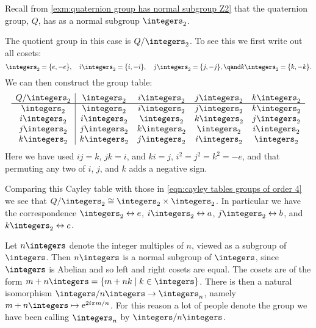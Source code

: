 \documentclass[fleqn]{NotesClass}
\newcommand*{\isomorphic}{\cong}
\newcommand*{\e}{\mathrm{e}}
\begin{document}
    \begin{exm}{}{}
        Recall from \cref{exm:quaternion group has normal subgroup Z2} that the quaternion group, \(Q\), has as a normal subgroup \(\integers_2\).
        
        The quotient group in this case is \(Q/\integers_2\).
        To see this we first write out all cosets:
        \begin{equation*}
            \integers_2 = \{e, -e\}, \quad i\integers_2 = \{i, -i\}, \quad j\integers_2 = \{j, -j\}, \qand k\integers_2 = \{k, -k\}.
        \end{equation*}
        We can then construct the group table:
        \begin{equation}
            \begin{array}{c|cccc}
                Q/\integers_2 & \integers_2  & i\integers_2 & j\integers_2 & k\integers_2\\ \hline
                \integers_2   & \integers_2  & i\integers_2 & j\integers_2 & k\integers_2\\
                i\integers_2  & i\integers_2 & \integers_2  & k\integers_2 & j\integers_2\\
                j\integers_2  & j\integers_2 & k\integers_2 & \integers_2  & i\integers_2\\
                k\integers_2  & k\integers_2 & j\integers_2 & i\integers_2 & \integers_2
            \end{array}
        \end{equation}
        Here we have used \(ij = k\), \(jk = i\), and \(ki = j\), \(i^2 = j^2 = k^2 = -e\), and that permuting any two of \(i\), \(j\), and \(k\) adds a negative sign.
        
        Comparing this Cayley table with those in \cref{eqn:cayley tables groups of order 4} we see that \(Q/\integers_2 \isomorphic \integers_2 \times \integers_2\).
        In particular we have the correspondence \(\integers_2 \leftrightarrow e\), \(i\integers_2 \leftrightarrow a\), \(j\integers_2 \leftrightarrow b\), and \(k\integers_2 \leftrightarrow c\).
    \end{exm}
    
    \begin{exm}{}{}
        Let \(n\integers\) denote the integer multiples of \(n\), viewed as a subgroup of \(\integers\).
        Then \(n\integers\) is a normal subgroup of \(\integers\), since \(\integers\) is Abelian and so left and right cosets are equal.
        The cosets are of the form \(m + n\integers = \{m + nk \mid k \in \integers\}\).
        There is then a natural isomorphism \(\integers/n\integers \to \integers_n\), namely \(m + n\integers \mapsto \e^{2i\pi m/n}\).
        For this reason a lot of people denote the group we have been calling \(\integers_n\) by \(\integers/n\integers\).
    \end{exm}
    
\end{document}
